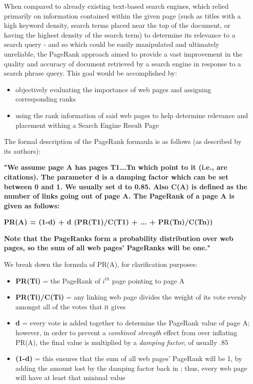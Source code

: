 \documentclass[pdftex,12pt,a4paper]{article}
\begin{document}
When compared to already existing text-based search engines, which relied primarily on information contained within the given page (such as titles with a high keyword density, search terms placed near the top of the document, or having the highest density of the search term) to determine its relevance to a search query - and so which could be easily manipulated and ultimately unreliable, the PageRank approach aimed to provide a vast improvement in the quality and accuracy of document retrieved by a search engine in response to a search  phrase query. This goal would be accomplished by:

\begin{itemize}
\item objectively evaluating the importance of web pages and assigning corresponding ranks
\item using the rank information of said web pages to help determine relevance and placement withing a Search Engine Result Page
\end{itemize}

The formal description of the PageRank formaula is as follows (as described by its authors):

\vspace{10pt}


\textbf{"We assume page A has pages T1...Tn which point to it (i.e., are citations).
The parameter d is a damping factor which can be set between 0 and 1. We
usually set d to 0.85.
Also C(A) is defined as the number of links going out of page A. The
PageRank of a page A is given as follows:}

\vspace{10pt}

\begin{centering}
\textbf{PR(A) = (1-d) + d (PR(T1)/C(T1) + ... + PR(Tn)/C(Tn))}
\end{centering}
\vspace{10pt}

\textbf{Note that the PageRanks form a probability distribution over web pages, so the sum of all web pages' PageRanks will be one."}

\vspace{10pt}

We break down the formula of PR(A), for clarification purposes:

\begin{itemize}
\item \textbf{PR(Ti)} = the PageRank of $i^{th}$ page pointing to page A
\item \textbf{PR(Ti)/C(Ti)} = any linking web page divides the weight of its vote evenly amongst all of the votes that it gives
\item \textbf{d} = every vote is added together to determine the PageRank value of page A; however, in order to prevent a \emph{combined strength} effect from over inflating PR(A), the final value is multiplied by a \emph{damping factor}, of usually .85
\item \textbf{(1-d)} = this ensures that the sum of all web pages' PageRank will be 1, by adding the amount lost by the damping factor back in ; thus, every web page will have at least that minimal value
\end{itemize}
\end{document}
